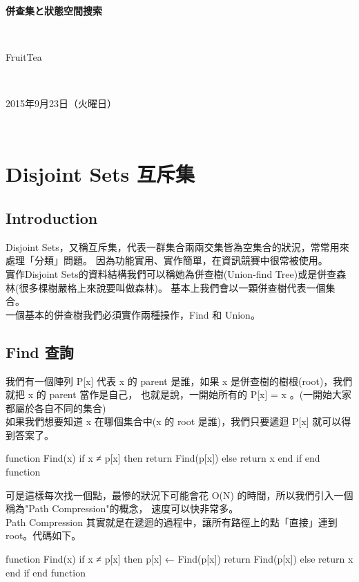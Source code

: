 \documentclass{article}
\title{\hmwkClass}
\author{\hmwkAuthorName}
\date{\hmwkDueDate}
\def\normalsize{\fontsize{12}{16}\selectfont}
\def\large{\fontsize{16}{24}\selectfont}
\def\LARGE{\fontsize{24}{36}\selectfont}
\newcommand{\hmwkDueDate}{2015年9月23日（火曜日）} %
\newcommand{\hmwkClass}{併查集と狀態空間搜索} %
\newcommand{\hmwkAuthorName}{FruitTea} %
\begin{document}
\LARGE~\\[4ex]
\centerline{\bf\hmwkClass}\large\\[2ex]\centerline{\hmwkAuthorName}\\[2ex]\centerline{\hmwkDueDate}\\
\normalsize

\section{Disjoint Sets 互斥集}
\subsection*{Introduction}
Disjoint Sets，又稱互斥集，代表一群集合兩兩交集皆為空集合的狀況，常常用來處理「分類」問題。
因為功能實用、實作簡單，在資訊競賽中很常被使用。\\
實作Disjoint Sets的資料結構我們可以稱她為併查樹(Union-find Tree)或是併查森林(很多棵樹嚴格上來說要叫做森林)。
基本上我們會以一顆併查樹代表一個集合。\\
一個基本的併查樹我們必須實作兩種操作，Find 和 Union。

\subsection{Find 查詢}
我們有一個陣列 P[x] 代表 x 的 parent 是誰，如果 x 是併查樹的樹根(root)，我們就把 x 的 parent 當作是自己，
也就是說，一開始所有的 P[x] = x 。(一開始大家都屬於各自不同的集合)\\
如果我們想要知道 x 在哪個集合中(x 的 root 是誰)，我們只要遞迴 P[x] 就可以得到答案了。

\begin{algorithm}[caption={Find}, label={alg1}]
function Find(x)
    if x ≠ p[x] then
        return Find(p[x])
    else
        return x
    end if
end function
\end{algorithm}

可是這樣每次找一個點，最慘的狀況下可能會花 O(N) 的時間，所以我們引入一個稱為"Path Compression"的概念，
速度可以快非常多。\\
Path Compression 其實就是在遞迴的過程中，讓所有路徑上的點「直接」連到root。代碼如下。

\begin{algorithm}[caption={Find \& Path Compression}, label={alg1}]
function Find(x)
    if x ≠ p[x] then
        p[x] ← Find(p[x])
        return Find(p[x])
    else
        return x
    end if
end function
\end{algorithm}
\end{document}
